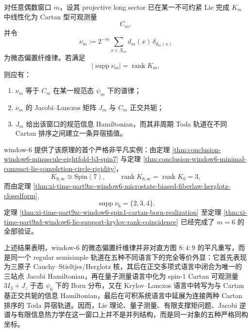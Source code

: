 \begin{conjecture}\label{conj:xi-time-part9zd-window6-cartan-lanczos-rigidity-principle}
对任意偶数窗口 \(m\)，设其 projective long sector 已在某一不可约紧 Lie 完成 \(K_m\) 中线性化为 Cartan 型可观测量
\[
C_m,
\]
并令
\[
\nu_m:=2^{-m}\sum_{x\in X_m}d_m(x)\,\delta_{d_m(x)}
\]
为微态偏置纤维律。若满足
\[
\left|\operatorname{supp}\nu_m\right|=\operatorname{rank}K_m,
\]
则应有：
\begin{enumerate}
  \item \(\nu_m\) 等于 \(C_m\) 在某一规范态 \(\psi_m\) 下的谱律；
  \item \(\nu_m\) 的 Jacobi--Lanczos 矩阵 \(J_m\) 与 \(C_m\) 正交共轭；
  \item \(J_m\) 给出该窗口的规范信息 Hamiltonian，而其非周期 Toda 轨道在不同 Cartan 排序之间建立一条异宿插值。
\end{enumerate}
window-\(6\) 提供了该原理的首个严格非平凡实例：由定理 \ref{thm:conclusion-window6-minuscule-eightfold-b3-spin7} 与定理 \ref{thm:conclusion-window6-minimal-compact-lie-completion-circle-rigidity}，
\[
K_{6,\mathrm{sc}}\cong \mathrm{Spin}(7),
\qquad
\operatorname{rank}K_{6,\mathrm{sc}}=\operatorname{rank}K_6=3,
\]
而由定理 \ref{thm:xi-time-part9zc-window6-microstate-biased-fiberlaw-herglotz-closedform},
\[
\operatorname{supp}\nu_6=\{2,3,4\}.
\]
定理 \ref{thm:xi-time-part9zc-window6-spin1-cartan-born-realization} 至定理 \ref{thm:xi-time-part9zd-window6-lie-support-krylov-rank-coincidence} 已经完成了 \(m=6\) 的全部验证。
\end{conjecture}

\noindent
上述结果表明，window-\(6\) 的微态偏置纤维律并非对直方图 \(8:4:9\) 的平凡重写，而是同一个 regular semisimple 轨道在五种不同语言下的完全等价外显：它首先表现为三原子 Cauchy--Stieltjes/Herglotz 核，其后在正交多项式语言中闭合为唯一的三站点 Jacobi Hamiltonian，再在量子测量语言中化为 spin-\(1\) Cartan 可观测量 \(3I_3+J_z\) 于态 \(\psi_6\) 下的 Born 分布，又在 Krylov--Lanczos 语言中转写为与 Cartan 基正交共轭的信息 Hamiltonian，最后在可积系统语言中延展为连接两种 Cartan 排序的 Toda 异宿轨道。因而，Lie 理论、量子测量、有限支撑矩问题、Jacobi 逆谱与有限信息热力学在这一窗口上并不是并列结构，而是同一对象的五种严格同构坐标。

\endinput
